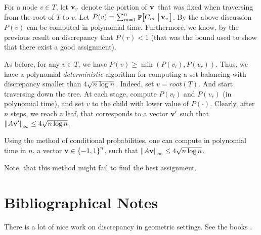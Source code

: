 For a node $v \in T$, let $\mathbf{v}_v$ denote the portion of $\mathbf{v}\,$
that was fixed when traversing from the root of $T$ to $v$.  Let
$P(v) = \sum_{\ind=1}^{n} \Prob{C_\ind \sep{\vecA_v}}$.  By the above
discussion $P(v)$ can be computed in polynomial time.  Furthermore, we
know, by the previous result on discrepancy that $P(r) < 1$ (that was
the bound used to show that there exist a good assignment).

As before, for any $v \in T$, we have $P(v) \geq \min(P(v_l),
P(v_r))$. Thus, we have a polynomial \emph{deterministic} algorithm
for computing a set balancing with discrepancy smaller than $4\sqrt{n
   \log{n}}$. Indeed, set $v = root(T)$. And start traversing down the
tree. At each stage, compute $P(v_l)$ and $P(v_r)$ (in polynomial
time), and set $v$ to the child with lower value of
$P(\cdot)$. Clearly, after $n$ steps, we reach a leaf, that
corresponds to a vector $\mathbf{v}'$ such that $\left\| {A \mathbf{v}'} \right\|_{\infty}
\leq 4 \sqrt{n \log{n}}$.

\begin{theorem}
    Using the method of conditional probabilities, one can compute in
    polynomial time in $n$, a vector $\mathbf{v} \in \left\{ {-1,1} \right\}^n$, such
    that $\left\| {A \mathbf{v}} \right\|_\infty \leq 4 \sqrt{n \log{n}}$.
\end{theorem}

Note, that this method might fail to find the best
assignment. 





\section{Bibliographical Notes}

There is a lot of nice work on discrepancy in geometric settings. See
the books \cite{c-dmrc-01, m-gd-99}.




\ChapterEnd{}

 
